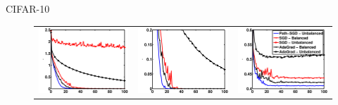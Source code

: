 \documentclass[presentation,xcolor={usenames,dvipsnames},10pt]{beamer}
\begin{document}
\begin{frame}{CIFAR-10}
\begin{figure}[t!]
	\begin{tabular}{lll}
		\includegraphics[scale=0.16]{cifar10-surr.pdf} & 
		\includegraphics[scale=0.16]{cifar10-train.pdf} &
		\includegraphics[scale=0.16]{cifar10-test.pdf} 

\end{tabular}
\end{figure}
\end{frame}
\end{document}
